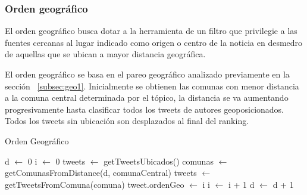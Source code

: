 \subsubsection{Orden geográfico}

El orden geográfico busca dotar a la herramienta de un filtro que privilegie a las fuentes cercanas al lugar indicado como origen o centro de la noticia en desmedro de aquellas que se ubican a mayor distancia geográfica.

El orden geográfico se basa en el pareo geográfico analizado previamente en la sección ~\ref{subsec:geo1}. Inicialmente se obtienen las comunas con menor distancia a la comuna central determinada por el tópico, la distancia se va aumentando progresivamente hasta clasificar todos los tweets de autores geoposicionados. Todos los tweets sin ubicación son desplazados al final del ranking. 

\begin{algorithm}[H]
	\caption{Orden Geográfico}\label{OrdenGeo}
	\begin{algorithmic}[H]
		\State d $\gets$ 0
		\State i $\gets$ 0
		\State tweets $\gets$ getTweetsUbicados()
			\State comunas $\gets$ getComunasFromDistance(d, comunaCentral)
				\State tweets $\gets$ getTweetsFromComuna(comuna)
					 \State tweet.ordenGeo $\gets$ i
					 \State i $\gets$ i + 1
				\EndFor
			\EndFor
			\State d $\gets$ d + 1
		\EndWhile
		\EndFunction	
	\end{algorithmic}
\end{algorithm}
